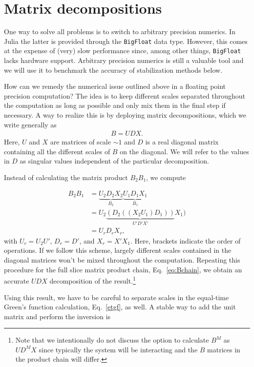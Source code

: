 \documentclass[%
 reprint,
superscriptaddress,
showpacs,
 amsmath,amssymb,
 aps,
 prb,
longbibliography,
]{revtex4-1}
\begin{document}
\section{\label{sec:decompositions}Matrix decompositions}

One way to solve all problems is to switch to arbitrary precision numerics. In Julia the latter is provided through the \texttt{BigFloat} data type. However, this comes at the expense of (very) slow performance since, among other things, \texttt{BigFloat} lacks hardware support. Arbitrary precision numerics is still a valuable tool and we will use it to benchmark the accuracy of stabilization methods below.

How can we remedy the numerical issue outlined above in a floating point precision computation? The idea is to keep different scales separated throughout the computation as long as possible and only mix them in the final step if necessary. A way to realize this is by deploying matrix decompositions, which we write generally as
\begin{align}
	B = UDX.
\end{align}
Here, $U$ and $X$ are matrices of scale $\sim 1$ and $D$ is a real diagonal matrix containing all the different scales of $B$ on the diagonal. We will refer to the values in $D$ as singular values independent of the particular decomposition.

Instead of calculating the matrix product $B_2 B_1$, we compute

\begin{align}
B_2 B_1 &= \underbrace{U_2 D_2 X_2}_{B_2}\underbrace{U_1 D_1 X_1}_{B_1} \nonumber\\
&= U_2 \underbrace{(D_2 ((X_2 U_1) D_1))}_{U' D' X'} X_1)\\
&= U_r D_r X_r, \nonumber
\end{align}
with $U_r = U_2 U'$, $D_r = D'$, and $X_r = X' X_1$. Here, brackets indicate the order of operations. If we follow this scheme, largely different scales contained in the diagonal matrices won't be mixed throughout the computation. Repeating this procedure for the full slice matrix product chain, Eq.~\eqref{eq:Bchain}, we obtain an accurate $UDX$ decomposition of the result.\footnote{Note that we intentionally do not discuss the option to calculate $B^M$ as $U D^M X$ since typically the system will be interacting and the $B$ matrices in the product chain will differ.}

Using this result, we have to be careful to separate scales in the equal-time Green's function calculation, Eq.~\ref{etgf}, as well. A stable way to add the unit matrix and perform the inversion is
\end{document}
